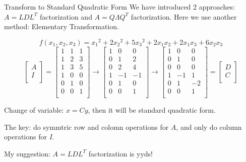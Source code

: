 \documentclass{beamer}
\begin{document}
\begin{frame}{Transform to Standard Quadratic Form}
We have introduced 2 approaches: $A=LDL^T$ factorization and $A=Q\varLambda Q^T$ factorization. Here we use another method: Elementary Transformation.

\begin{equation*}
    f\left( x_1, x_2, x_3 \right) ={x_1}^2+2{x_2}^2+5{x_3}^2+2x_1x_2+2x_1x_3+6x_2x_3
\end{equation*}
\begin{equation*}
    \left[ \begin{array}{c}
        A\\
        I\\
    \end{array} \right] =\left[ \begin{matrix}
        1&		1&		1\\
        1&		2&		3\\
        1&		3&		5\\
        1&		0&		0\\
        0&		1&		0\\
        0&		0&		1\\
    \end{matrix} \right] \rightarrow \left[ \begin{matrix}
        1&		0&		0\\
        0&		1&		2\\
        0&		2&		4\\
        1&		-1&		-1\\
        0&		1&		0\\
        0&		0&		1\\
    \end{matrix} \right] \rightarrow \left[ \begin{matrix}
        1&		0&		0\\
        0&		1&		0\\
        0&		0&		0\\
        1&		-1&		1\\
        0&		1&		-2\\
        0&		0&		1\\
    \end{matrix} \right] =\left[ \begin{array}{c}
        D\\
        C\\
    \end{array} \right]
\end{equation*}

Change of variable: $x=Cy$, then it will be standard quadratic form.

\vspace{3pt}
The key: do symmtric row and colomn operations for $A$, and only do column operations for $I$.

\vspace{3pt}
My suggestion: $A=LDL^T$ factorization is yyds!
\end{frame}
\end{document}
